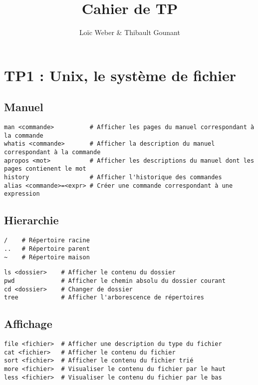 \documentclass{article}
\author{Loïc Weber \& Thibault Gounant}
\title{Cahier de TP}
\begin{document}
\setlength\parindent{0pt}

\maketitle

\renewcommand*\contentsname{Table des matières}
\tableofcontents

\section{TP1 : Unix, le système de fichier}

\subsection{Manuel}
\begin{verbatim}
man <commande>          # Afficher les pages du manuel correspondant à la commande
whatis <commande>       # Afficher la description du manuel correspondant à la commande
apropos <mot>           # Afficher les descriptions du manuel dont les pages contienent le mot 
history                 # Afficher l'historique des commandes
alias <commande>=<expr> # Créer une commande correspondant à une expression
\end{verbatim}

\subsection{Hierarchie}
\begin{verbatim}
/    # Répertoire racine
..   # Répertoire parent
~    # Répertoire maison
\end{verbatim}

\begin{verbatim}
ls <dossier>    # Afficher le contenu du dossier
pwd             # Afficher le chemin absolu du dossier courant
cd <dossier>    # Changer de dossier
tree            # Afficher l'arborescence de répertoires
\end{verbatim}

\subsection{Affichage}
\begin{verbatim}
file <fichier>  # Afficher une description du type du fichier
cat <fichier>   # Afficher le contenu du fichier
sort <fichier>  # Afficher le contenu du fichier trié
more <fichier>  # Visualiser le contenu du fichier par le haut
less <fichier>  # Visualiser le contenu du fichier par le bas
\end{verbatim}
\end{document}
